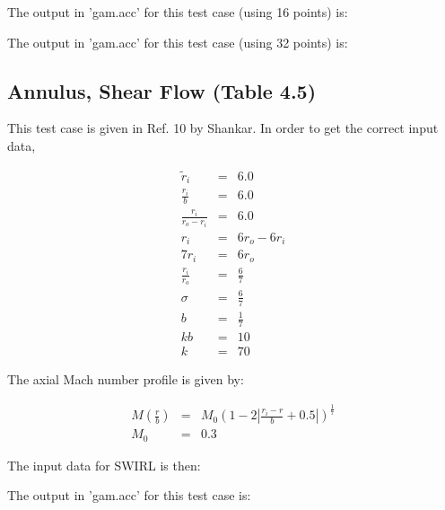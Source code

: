 \documentclass[12pt]{article}
\begin{document}
The output in 'gam.acc' for this test case (using 16 points) is:

\begin{tiny}
\end{tiny}%

The output in 'gam.acc' for this test case (using 32 points) is:

\begin{tiny}
\end{tiny}%

\subsection{Annulus, Shear Flow (Table 4.5)}

This test case is given in Ref. 10 by Shankar.   In order to
get the correct input data,

\begin{eqnarray}
\widetilde{r}_i  
&=& 6.0
\nonumber
\\
\frac{r_i}{b}
&=& 6.0
\nonumber
\\
\frac{r_i}{r_o - r_i}
&=& 6.0
\nonumber
\\
r_i
&=& 6 r_o - 6 r_i
\nonumber
\\
7 r_i
&=& 6 r_o 
\nonumber
\\
\frac{r_i}{r_o}
&=& \frac{6}{7} 
\nonumber
\\
\sigma &=& \frac{6}{7}
\nonumber
\\
b &=& \frac{1}{7}
\nonumber
\\
k b &=& 10
\nonumber
\\
k &=& 70
\nonumber
\end{eqnarray}

The axial Mach number profile is given by:

\begin{eqnarray}
M \left(\frac{r}{b} \right)
&=&
M_0 \left(1 - 2 \left| \frac{r_i - r}{b} + 0.5 \right| \right)^{\frac{1}{7}}
\nonumber
\\
M_0 &=& 0.3
\nonumber
\end{eqnarray}

The input data for SWIRL is then:

\begin{tiny}
\end{tiny}%

The output in 'gam.acc' for this test case is:

\begin{tiny}
\end{tiny}%
\end{document}
